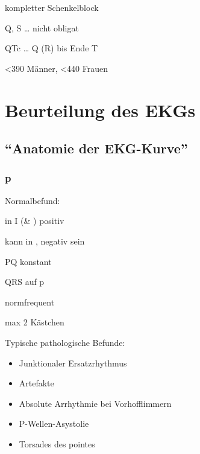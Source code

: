  kompletter Schenkelblock

Q, S \ldots{} nicht obligat

QTc \ldots{} Q (R) bis Ende T

<390 Männer, <440 Frauen

\section{Beurteilung des EKGs}




\subsection{\enquote{Anatomie der EKG-Kurve}}

\subsubsection{p}

Normalbefund:

in I (\& ) positiv

kann in ,  negativ sein

PQ konstant

QRS auf p

normfrequent

max 2 Kästchen


Typische pathologische Befunde:

\begin{itemize}
  \item Junktionaler Ersatzrhythmus
  \item Artefakte
  \item Absolute Arrhythmie bei Vorhofflimmern
  \item P-Wellen-Asystolie
  \item Torsades des pointes
\end{itemize}

